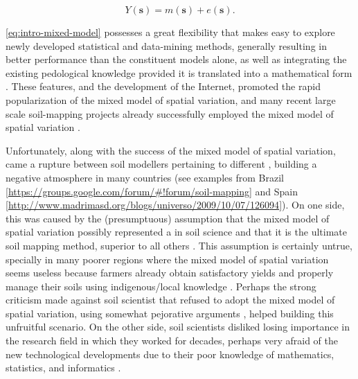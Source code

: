 \begin{equation}\label{eq:intro-mixed-model}
Y(\boldsymbol{s}) = m(\boldsymbol{s}) + e(\boldsymbol{s}).
\end{equation}

\autoref{eq:intro-mixed-model} possesses a great flexibility that makes easy to explore newly developed 
statistical and 
data-mining methods, generally resulting in better performance than the constituent models alone, as well as 
integrating the 
existing pedological knowledge provided it is translated into a mathematical form \cite{OdehEtAl1994, 
OdehEtAl1995, 
Heuvelink1996, McBratneyEtAl2000, HenglEtAl2004, Lopez-GranadosEtAl2005, WebsterEtAl2007, Grunwald2009, 
Lark2012}. These features, and the development of the Internet, promoted the rapid popularization of the mixed 
model of 
spatial variation, and many recent large scale soil-mapping projects already successfully employed the mixed 
model of spatial
variation \cite{PoggioEtAl2014, NussbaumEtAl2014, HenglEtAl2015}.

Unfortunately, along with the success of the mixed model of spatial variation, came a rupture between soil 
modellers pertaining to different , building a negative atmosphere in many
countries (see examples from Brazil [\url{https://groups.google.com/forum/#!forum/soil-mapping}] and
Spain [\url{http://www.madrimasd.org/blogs/universo/2009/10/07/126094}]). On one side, this was
caused by the (presumptuous) assumption that the mixed model of spatial variation possibly
represented a  in soil science \cite{McBratneyEtAl2003} and that it is the
ultimate soil mapping method, superior to all others \cite{MinasnyEtAl2016}. This assumption is
certainly untrue, specially in many poorer regions where the mixed model of spatial variation seems
useless because farmers already obtain satisfactory yields and properly manage their soils using
indigenous/local knowledge
\cite{Barrera-BassolsEtAl2003, Barrera-BassolsEtAl2006, HillyerEtAl2006, CorreiaEtAl2007, ValeJuniorEtAl2007}.
Perhaps the strong criticism made against soil scientist that
refused to adopt the mixed model of spatial variation, using somewhat pejorative arguments
\cite{HeuvelinkEtAl2001,Mendonca-SantosEtAl2003}, helped building this unfruitful scenario. On
the other side, soil scientists disliked losing importance in the research field in which they worked for
decades, perhaps very afraid of the new technological developments due to their poor knowledge of
mathematics, statistics, and informatics \cite{Webster2001,SamuelRosa2012}.

